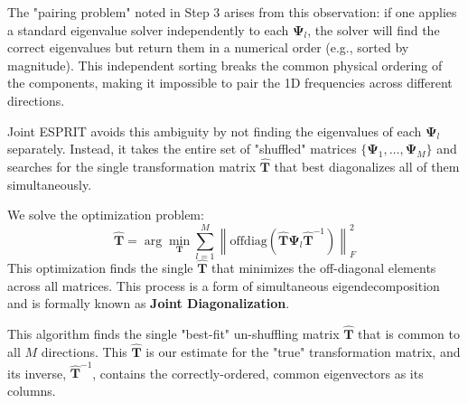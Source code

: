 The "pairing problem" noted in Step 3 arises from this observation: if one applies a standard eigenvalue solver independently to each $\mathbf{\Psi}_l$, the solver will find the correct eigenvalues but return them in a numerical order (e.g., sorted by magnitude). This independent sorting breaks the common physical ordering of the components, making it impossible to pair the 1D frequencies across different directions.

Joint ESPRIT avoids this ambiguity by not finding the eigenvalues of each $\mathbf{\Psi}_l$ separately. Instead, it takes the entire set of "shuffled" matrices $\{\mathbf{\Psi}_1, \dots, \mathbf{\Psi}_M\}$ and searches for the single transformation matrix $\hat{\mathbf{T}}$ that best diagonalizes all of them simultaneously.

We solve the optimization problem:
$$ \hat{\mathbf{T}} = \arg\min_\mathbf{T} \sum_{l=1}^M \left\|
\text{offdiag}(\hat{\mathbf{T}} \mathbf{\Psi}_l \hat{\mathbf{T}}^{-1}) \right\|_F^2 $$
This optimization finds the single $\hat{\mathbf{T}}$ that minimizes the off-diagonal elements across all matrices. This process is a form of simultaneous eigendecomposition and is formally known as \textbf{Joint Diagonalization}.

This algorithm finds the single "best-fit" un-shuffling matrix $\hat{\mathbf{T}}$ that is common to all $M$ directions. This $\hat{\mathbf{T}}$ is our estimate for the "true" transformation matrix, and its inverse, $\hat{\mathbf{T}}^{-1}$, contains the correctly-ordered, common eigenvectors as its columns.

